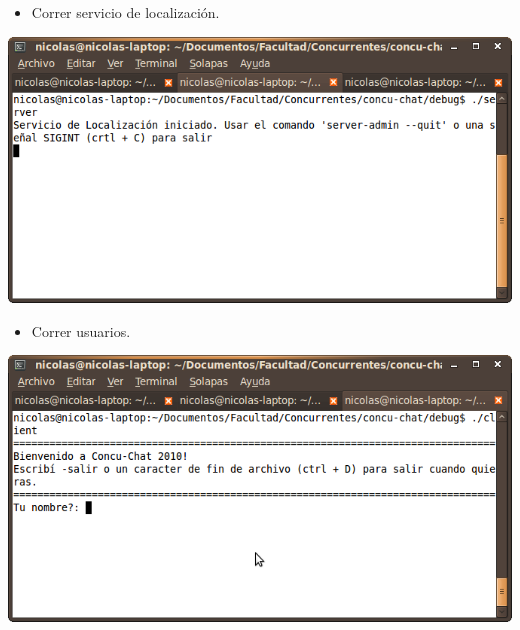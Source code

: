 \begin{itemize}
  \item Correr servicio de localización.
\end{itemize}
\begin{center}
  \small\includegraphics[scale=0.65]{./Images/Server}
\end{center}

\begin{itemize}
  \item Correr usuarios.
\end{itemize}
\begin{center}
  \small\includegraphics[scale=0.65]{./Images/Cliente}
\end{center}

